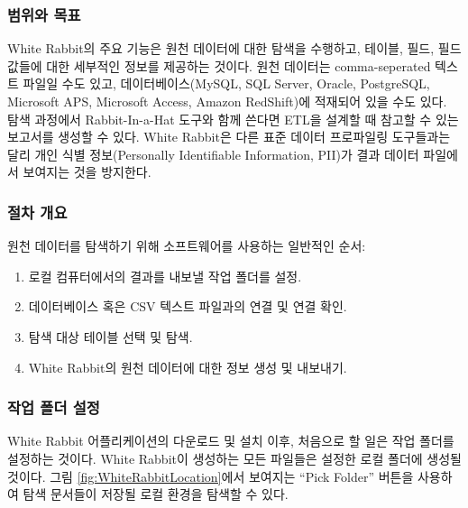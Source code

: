 \documentclass[11pt]{book}
\providecommand{\tightlist}{%
  \setlength{\itemsep}{0pt}\setlength{\parskip}{0pt}}
\theoremstyle{definition}
\theoremstyle{definition}
\theoremstyle{definition}
\theoremstyle{remark}
\begin{document}
\subsubsection*{범위와 목표}\label{-}

White Rabbit의 주요 기능은 원천 데이터에 대한 탐색을 수행하고, 테이블,
필드, 필드값들에 대한 세부적인 정보를 제공하는 것이다. 원천 데이터는
comma-seperated 텍스트 파일일 수도 있고, 데이터베이스(MySQL, SQL Server,
Oracle, PostgreSQL, Microsoft APS, Microsoft Access, Amazon RedShift)에
적재되어 있을 수도 있다. 탐색 과정에서 Rabbit-In-a-Hat 도구와 함께
쓴다면 ETL을 설계할 때 참고할 수 있는 보고서를 생성할 수 있다. White
Rabbit은 다른 표준 데이터 프로파일링 도구들과는 달리 개인 식별
정보(Personally Identifiable Information, PII)가 결과 데이터 파일에서
보여지는 것을 방지한다.

\subsubsection*{절차 개요}\label{-}

원천 데이터를 탐색하기 위해 소프트웨어를 사용하는 일반적인 순서:

\begin{enumerate}
\def\labelenumi{\arabic{enumi}.}
\tightlist
\item
  로컬 컴퓨터에서의 결과를 내보낼 작업 폴더를 설정.
\item
  데이터베이스 혹은 CSV 텍스트 파일과의 연결 및 연결 확인.
\item
  탐색 대상 테이블 선택 및 탐색.
\item
  White Rabbit의 원천 데이터에 대한 정보 생성 및 내보내기.
\end{enumerate}

\subsubsection*{작업 폴더 설정}\label{--}

White Rabbit 어플리케이션의 다운로드 및 설치 이후, 처음으로 할 일은 작업
폴더를 설정하는 것이다. White Rabbit이 생성하는 모든 파일들은 설정한
로컬 폴더에 생성될 것이다. 그림 \ref{fig:WhiteRabbitLocation}에서
보여지는 ``Pick Folder'' 버튼을 사용하여 탐색 문서들이 저장될 로컬
환경을 탐색할 수 있다.
\end{document}
